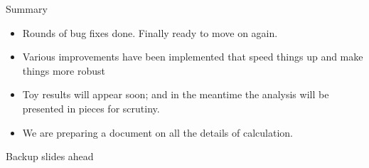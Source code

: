 \documentclass[11pt,t]{beamer}
\begin{document}
\begin{frame}{Summary}
   \begin{itemize}
   \item Rounds of bug fixes done.  Finally ready to move on again.
   \item Various improvements have been implemented that speed things up and make things more robust
   \item Toy results will appear soon; and in the meantime the analysis will be presented in pieces for scrutiny.
   \item We are preparing a document on all the details of calculation.
   \end{itemize}
\end{frame}

\begin{frame}{Backup slides ahead}
\end{frame}
\end{document}
